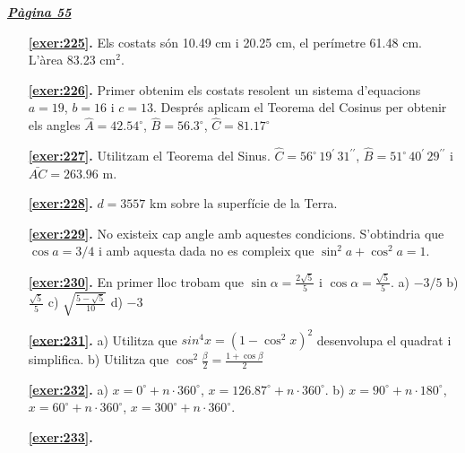 \hyperlink{page.55}{\textbf{\em Pàgina 55}}
\begin{enumerate}
\item[\fontfamily{phv}\selectfont\color{blue}\textbf{\ref{exer:225}. }] \label{ans:225} 
Els costats són 10.49 cm i 20.25 cm, el perímetre 61.48 cm. L'àrea 83.23 cm$^2$.
 \end{enumerate}
\begin{enumerate}
\item[\fontfamily{phv}\selectfont\color{blue}\textbf{\ref{exer:226}. }] \label{ans:226} 
Primer obtenim els costats resolent un sistema d'equacions $a=19$, $b=16$ i $c=13$. Després aplicam el Teorema del Cosinus per obtenir els angles $\hat A=42.54^\circ $, $\hat B=56.3^\circ $, $\hat C=81.17^\circ $
\item[\fontfamily{phv}\selectfont\color{blue}\textbf{\ref{exer:227}. }] \label{ans:227} 
Utilitzam el Teorema del Sinus. $\hat C= 56^\circ \, 19^\prime \, 31^{\prime \prime }$, $\hat B= 51^\circ \, 40^\prime \, 29^{\prime \prime }$ i $\bar {AC}=263.96$ m.
\item[\fontfamily{phv}\selectfont\color{blue}\textbf{\ref{exer:228}. }] \label{ans:228} 
$d=3557$ km sobre la superfície de la Terra.
\item[\fontfamily{phv}\selectfont\color{blue}\textbf{\ref{exer:229}. }] \label{ans:229} 
No existeix cap angle amb aquestes condicions. S'obtindria que $\cos a = 3/4$ i amb aquesta dada no es compleix que $\sin ^2 a +\cos ^2 a = 1$.
\item[\fontfamily{phv}\selectfont\color{blue}\textbf{\ref{exer:230}. }] \label{ans:230} 
En primer lloc trobam que $\sin \alpha = \frac {2\sqrt 5}{5}$ i $\cos \alpha = \frac {\sqrt 5}{5}$. a) $-3/5$ \quad b) $\frac {\sqrt 5}{5}$ \quad c) $\sqrt {\frac {5-\sqrt 5}{10}}$ \quad d) $-3$
\item[\fontfamily{phv}\selectfont\color{blue}\textbf{\ref{exer:231}. }] \label{ans:231} 
a) Utilitza que $sin^4 x = (1-\cos ^2 x)^2$ desenvolupa el quadrat i simplifica. b) Utilitza que $\cos ^2 \frac {\beta }{2} = \frac {1+\cos \beta }{2}$ 
\item[\fontfamily{phv}\selectfont\color{blue}\textbf{\ref{exer:232}. }] \label{ans:232} 
a) $x= 0^\circ + n\cdot 360^\circ $, $x=126.87^\circ + n\cdot 360^\circ $. b) $x= 90^\circ + n\cdot 180^\circ $, $x= 60^\circ + n\cdot 360^\circ $, $x= 300^\circ + n\cdot 360^\circ $.
\item[\fontfamily{phv}\selectfont\color{blue}\textbf{\ref{exer:233}. }] \label{ans:233} 

\end{enumerate}
